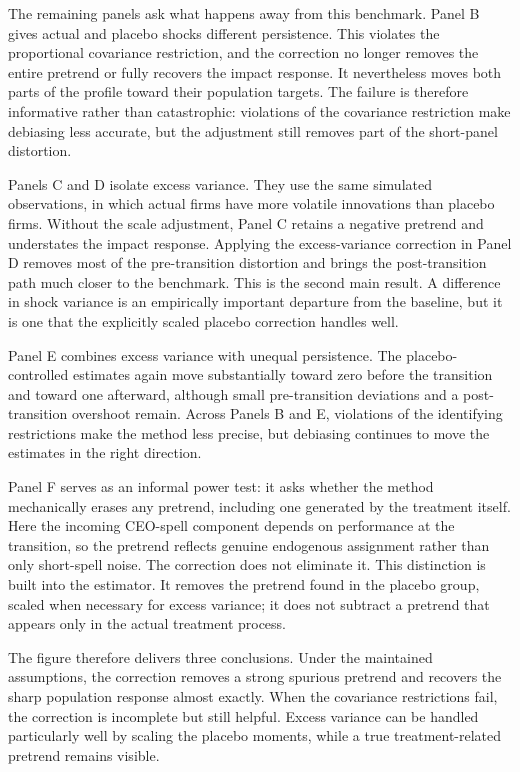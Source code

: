 \documentclass[sigconf,nonacm]{acmart}
\begin{document}
The remaining panels ask what happens away from this benchmark. Panel B gives actual and placebo shocks different persistence. This violates the proportional covariance restriction, and the correction no longer removes the entire pretrend or fully recovers the impact response. It nevertheless moves both parts of the profile toward their population targets. The failure is therefore informative rather than catastrophic: violations of the covariance restriction make debiasing less accurate, but the adjustment still removes part of the short-panel distortion.

Panels C and D isolate excess variance. They use the same simulated observations, in which actual firms have more volatile innovations than placebo firms. Without the scale adjustment, Panel C retains a negative pretrend and understates the impact response. Applying the excess-variance correction in Panel D removes most of the pre-transition distortion and brings the post-transition path much closer to the benchmark. This is the second main result. A difference in shock variance is an empirically important departure from the baseline, but it is one that the explicitly scaled placebo correction handles well.

Panel E combines excess variance with unequal persistence. The placebo-controlled estimates again move substantially toward zero before the transition and toward one afterward, although small pre-transition deviations and a post-transition overshoot remain. Across Panels B and E, violations of the identifying restrictions make the method less precise, but debiasing continues to move the estimates in the right direction.

\balance

Panel F serves as an informal power test: it asks whether the method mechanically erases any pretrend, including one generated by the treatment itself. Here the incoming CEO-spell component depends on performance at the transition, so the pretrend reflects genuine endogenous assignment rather than only short-spell noise. The correction does not eliminate it. This distinction is built into the estimator. It removes the pretrend found in the placebo group, scaled when necessary for excess variance; it does not subtract a pretrend that appears only in the actual treatment process.

The figure therefore delivers three conclusions. Under the maintained assumptions, the correction removes a strong spurious pretrend and recovers the sharp population response almost exactly. When the covariance restrictions fail, the correction is incomplete but still helpful. Excess variance can be handled particularly well by scaling the placebo moments, while a true treatment-related pretrend remains visible.
\end{document}
